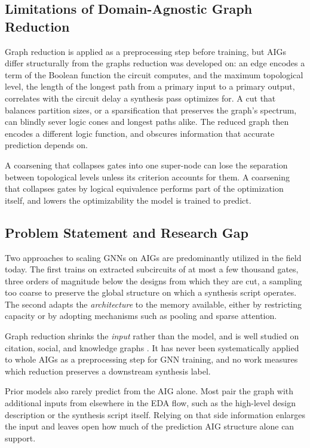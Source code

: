 \subsection{Limitations of Domain-Agnostic Graph Reduction}
\label{sec:intro:motivation:reduction}
Graph reduction is applied as a preprocessing step before training, but AIGs differ
structurally from the graphs reduction was developed on: an edge encodes a term of
the Boolean function the circuit computes, and the maximum topological level, the length of
the longest path from a primary input to a primary output, correlates with the circuit delay
a synthesis pass optimizes for. A cut that balances partition sizes, or a sparsification that
preserves the graph's spectrum, can blindly sever logic cones and longest paths alike.
The reduced graph then encodes a different logic function, and obscures information that accurate
prediction depends on.

A coarsening that collapses gates into one super-node can lose the separation between
topological levels unless its criterion accounts for them. A coarsening that collapses gates
by logical equivalence performs part of the optimization itself, and lowers the optimizability
the model is trained to predict.

\subsection{Problem Statement and Research Gap}
\label{sec:intro:gap}
Two approaches to scaling GNNs on AIGs are predominantly utilized in the field today. The
first trains on extracted subcircuits of at most a few thousand gates, three orders of
magnitude below the designs from which they are cut, a sampling
too coarse to preserve the global structure on which a synthesis script operates. The second
adapts the \emph{architecture} to the memory available, either by restricting capacity or by
adopting mechanisms such as pooling and sparse attention.

Graph reduction shrinks the \emph{input} rather than the model, and is well studied on
citation, social, and knowledge graphs \citep{hashemi2024survey}. It has never been
systematically applied to whole AIGs as a preprocessing step for GNN training, and no work
measures which reduction preserves a downstream synthesis label.

Prior models also rarely predict from the AIG alone. Most pair the graph with additional
inputs from elsewhere in the EDA flow, such as the high-level design description or the
synthesis script itself. Relying on that side information enlarges the input and leaves open
how much of the prediction AIG structure alone can support.


